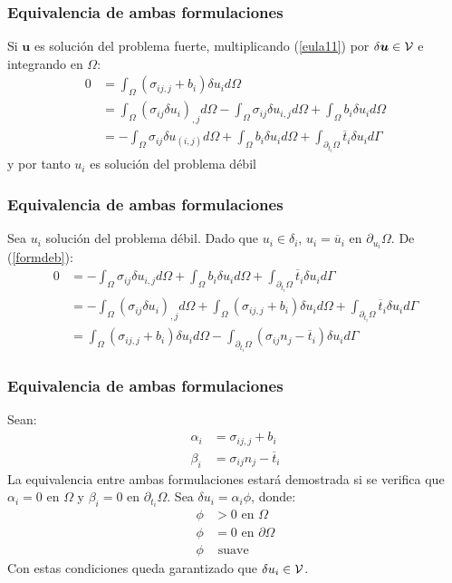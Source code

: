 \documentclass[handout]{beamer}
\begin{document}
\begin{frame}
\frametitle{Equivalencia de ambas formulaciones}
Si $\bm{u}$ es solución del problema fuerte,
multiplicando (\ref{eula11}) por $\delta \bm{u} \in {\cal V}$ e integrando en
$\Omega$:
\begin{align}
0&= \int_{\Omega} (\sigma_{ij,j}+b_i)\delta u_i d\Omega \nonumber \\
 &= \int_{\Omega} (\sigma_{ij}\delta u_i)_{,j} d \Omega -
    \int_{\Omega}  \sigma_{ij}\delta u_{i,j} d \Omega +  
    \int_{\Omega} b_i \delta u_i d\Omega \nonumber \\
 &=-\int_{\Omega} \sigma_{ij}\delta u_{(i,j)} d \Omega +
    \int_{\Omega}  b_i \delta u_i d\Omega + 
    \int_{\partial_{t_i}\Omega}  \overline{t}_i \delta u_i d \Gamma
\end{align}
y por tanto $u_i$ es solución del problema débil
\end{frame}
\begin{frame}
\frametitle{Equivalencia de ambas formulaciones}
Sea $u_i$ solución del problema débil. Dado que $u_i \in \delta_i$, $u_i=
\overline{u}_i$ en $\partial_{u_i} \Omega$. De (\ref{formdeb}):
\begin{align}
0&=-\int_{\Omega} \sigma_{ij}\delta u_{i,j} d \Omega +
  \int_{\Omega}  b_i \delta u_i d\Omega +
  \int_{\partial_{t_i}\Omega}  \overline{t}_i \delta u_i d \Gamma \nonumber \\
 &=-\int_{\Omega} (\sigma_{ij}\delta u_i)_{,j} d \Omega +
  \int_{\Omega} (\sigma_{ij,j}+b_i)\delta u_i d \Omega +
  \int_{\partial_{t_i}\Omega}  \overline{t}_i \delta u_i d \Gamma \nonumber \\
 &= \int_{\Omega} (\sigma_{ij,j}+b_i)\delta u_i d \Omega -
  \int_{\partial_{t_i}\Omega}(\sigma_{ij}n_j-\overline{t}_i)\delta u_i d \Gamma
\label{demoeq}
\end{align}
\end{frame}
\begin{frame}
\frametitle{Equivalencia de ambas formulaciones}
Sean:
\begin{align}
\alpha_i&=\sigma_{ij,j}+b_i \\
\beta_i&=\sigma_{ij}n_j-\overline{t}_i
\end{align}
La equivalencia entre ambas formulaciones estará demostrada si se verifica
que $\alpha_i=0$ en $\Omega$ y $\beta_i=0$ en $\partial_{t_i} \Omega$.
Sea $\delta u_i=\alpha_i \phi$, donde:
\begin{align*}
\phi&>0 \textrm{ en } \Omega \\
\phi&=0 \textrm{ en } \partial \Omega \\
\phi& \textrm{ suave}
\end{align*}
Con estas condiciones queda garantizado que $\delta u_i \in {\cal V}$.
\end{frame}
\end{document}
